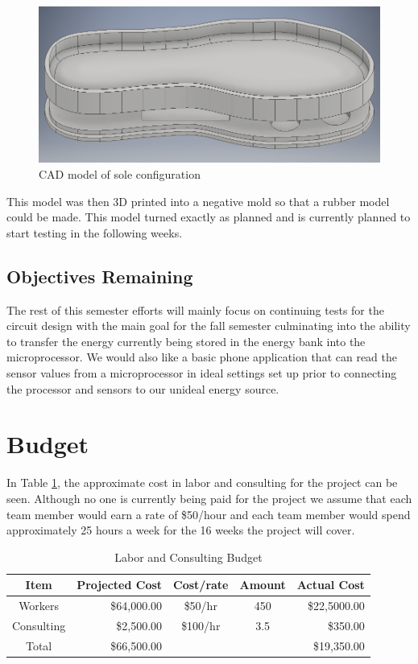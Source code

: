 \documentclass[letterpaper, 12 pt, onecolumn, hidelinks]{ieeetran}
\begin{document}
\begin{figure}[h]
	\begin{center}
		\includegraphics[width=\columnwidth]{Sole.png}
	\end{center}
	\vspace{-1em}
	\caption{\label{fig:CAD}CAD model of sole configuration}
\end{figure}

This model was then 3D printed into a negative mold so that a rubber model could be made. This model turned exactly as planned and is currently planned to start testing in the following weeks.

\subsection{Objectives Remaining}\label{sec:Remaining}
The rest of this semester efforts will mainly focus on continuing tests for the circuit design with the main goal for the fall semester culminating into the ability to transfer the energy currently being stored in the energy bank into the microprocessor. We would also like a basic phone application that can read the sensor values from a microprocessor in ideal settings set up prior to connecting the processor and sensors to our unideal energy source.

\section{Budget}\label{sec:Budget}
In Table \ref{table:Labor}, the approximate cost in labor and consulting for the project can be seen. Although no one is currently being paid for the project we assume that each team member would earn a rate of \$50/hour and each team member would spend approximately 25 hours a week for the 16 weeks the project will cover.

\begin{table}[h!]
	\caption{\label{table:Labor}Labor and Consulting Budget}
	\begin{center}
		\begin{tabular}{ c|r c c r } 
			Item & Projected Cost & Cost/rate & Amount & Actual Cost \\
			\hline
			Workers & \$64,000.00 & \$50/hr & 450 & \$22,5000.00 \\ 
			Consulting & \$2,500.00 & \$100/hr & 3.5 & \$350.00 \\ 
			\hline
			Total & \$66,500.00 &  &  & \$19,350.00 \\
		\end{tabular}
	\end{center}
\end{table}
\end{document}
